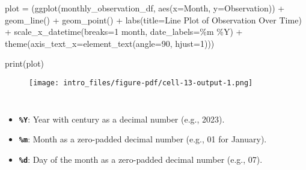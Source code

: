 \documentclass[
  letterpaper,
  DIV=11,
  numbers=noendperiod]{scrreprt}
\newenvironment{Shaded}{\begin{snugshade}}{\end{snugshade}}
\newcommand{\BuiltInTok}[1]{\textcolor[rgb]{0.00,0.23,0.31}{#1}}
\newcommand{\DecValTok}[1]{\textcolor[rgb]{0.68,0.00,0.00}{#1}}
\newcommand{\NormalTok}[1]{\textcolor[rgb]{0.00,0.23,0.31}{#1}}
\newcommand{\OperatorTok}[1]{\textcolor[rgb]{0.37,0.37,0.37}{#1}}
\newcommand{\StringTok}[1]{\textcolor[rgb]{0.13,0.47,0.30}{#1}}
\begin{document}
\begin{Shaded}
\begin{Highlighting}[]
\NormalTok{plot }\OperatorTok{=}\NormalTok{ (ggplot(monthly\_observation\_df, aes(x}\OperatorTok{=}\StringTok{\textquotesingle{}Month\textquotesingle{}}\NormalTok{, y}\OperatorTok{=}\StringTok{\textquotesingle{}Observation\textquotesingle{}}\NormalTok{)) }\OperatorTok{+}
\NormalTok{        geom\_line() }\OperatorTok{+}
\NormalTok{        geom\_point() }\OperatorTok{+}
\NormalTok{        labs(title}\OperatorTok{=}\StringTok{\textquotesingle{}Line Plot of Observation Over Time\textquotesingle{}}\NormalTok{) }\OperatorTok{+} 
\NormalTok{        scale\_x\_datetime(breaks}\OperatorTok{=}\StringTok{\textquotesingle{}1 month\textquotesingle{}}\NormalTok{,  date\_labels}\OperatorTok{=}\StringTok{\textquotesingle{}\%m \%Y\textquotesingle{}}\NormalTok{) }\OperatorTok{+} 
\NormalTok{        theme(axis\_text\_x}\OperatorTok{=}\NormalTok{element\_text(angle}\OperatorTok{=}\DecValTok{90}\NormalTok{, hjust}\OperatorTok{=}\DecValTok{1}\NormalTok{)))}

\BuiltInTok{print}\NormalTok{(plot)}
\end{Highlighting}
\end{Shaded}

\begin{figure}[H]

{\centering \texttt{[image: intro\_files/figure-pdf/cell-13-output-1.png]}

}

\end{figure}

\begin{verbatim}
\end{verbatim}

\begin{verbatim}
\end{verbatim}

\begin{itemize}
\item
  \textbf{\texttt{\%Y}}: Year with century as a decimal number (e.g.,
  2023).
\item
  \textbf{\texttt{\%m}}: Month as a zero-padded decimal number (e.g., 01
  for January).
\item
  \textbf{\texttt{\%d}}: Day of the month as a zero-padded decimal
  number (e.g., 07).
\end{itemize}

\begin{verbatim}
\end{verbatim}
\end{document}
